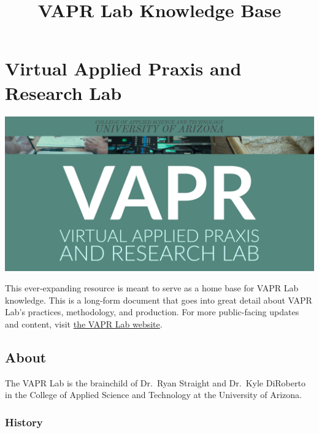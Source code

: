 \documentclass[12pt,]{memoir}
\title{VAPR Lab Knowledge Base}
\author{}
\date{}
\begin{document}
\maketitle

{
\hypersetup{linkcolor=black}
\setcounter{tocdepth}{1}
\tableofcontents
}
\listoftables
\listoffigures
\hypertarget{virtual-applied-praxis-and-research-lab}{%
\chapter*{Virtual Applied Praxis and Research Lab}\label{virtual-applied-praxis-and-research-lab}}

\includegraphics[width=30in]{images/VAPR-brand-banner}

This ever-expanding resource is meant to serve as a home base for VAPR Lab knowledge. This is a long-form document that goes into great detail about VAPR Lab's practices, methodology, and production. For more public-facing updates and content, visit \href{https://VAPR-Lab.github.io/vapr-website}{the VAPR Lab website}.

\hypertarget{about}{%
\section*{About}\label{about}}

The VAPR Lab is the brainchild of Dr.~Ryan Straight and Dr.~Kyle DiRoberto in the College of Applied Science and Technology at the University of Arizona.

\hypertarget{history}{%
\subsection*{History}\label{history}}
\end{document}
